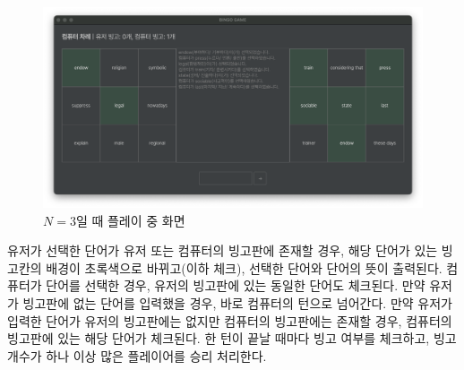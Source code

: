 \begin{figure}[H]
    \centering
    \includegraphics[scale=0.3]{img/game-3x3-playing.png}
    \caption{$N = 3$일 때 플레이 중 화면}
\end{figure}
유저가 선택한 단어가 유저 또는 컴퓨터의 빙고판에 존재할 경우, 해당 단어가 있는 빙고칸의 배경이 초록색으로 바뀌고(이하 체크), 선택한 단어와 단어의 뜻이 출력된다.
컴퓨터가 단어를 선택한 경우, 유저의 빙고판에 있는 동일한 단어도 체크된다.
만약 유저가 빙고판에 없는 단어를 입력했을 경우, 바로 컴퓨터의 턴으로 넘어간다.
만약 유저가 입력한 단어가 유저의 빙고판에는 없지만 컴퓨터의 빙고판에는 존재할 경우, 컴퓨터의 빙고판에 있는 해당 단어가 체크된다.
한 턴이 끝날 때마다 빙고 여부를 체크하고, 빙고 개수가 하나 이상 많은 플레이어를 승리 처리한다.

